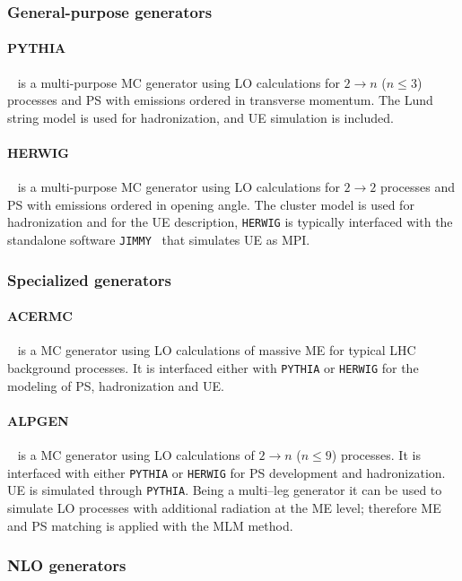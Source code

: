 \subsubsection*{General-purpose generators}

\paragraph{PYTHIA}~\cite{pythia6,pythia8} is a multi-purpose MC
generator using LO calculations for $2 \to n$ ($n\leq 3$) processes
and PS with emissions ordered in transverse momentum. 
The Lund string model is used for hadronization, and UE simulation is
included.

\paragraph{HERWIG}~\cite{herwig} is a multi-purpose MC generator using LO
calculations for $2 \to 2$ processes and PS with emissions ordered in
opening angle. 
The cluster model is used for hadronization and for the UE
description, \texttt{HERWIG} is typically interfaced with the
standalone software \texttt{JIMMY}~\cite{jimmy} that simulates UE as MPI.

\subsubsection*{Specialized generators}

\paragraph{ACERMC}~\cite{acermc} is a MC generator using LO
calculations of massive ME for typical LHC background processes. It is
interfaced either with \texttt{PYTHIA} or \texttt{HERWIG} for the
modeling of PS, hadronization and UE.

\paragraph{ALPGEN}~\cite{alpgen} is a MC generator using LO calculations
of $2 \to n$ ($n\leq 9$) processes. It is interfaced with either
\texttt{PYTHIA} or \texttt{HERWIG} for PS development and
hadronization. UE is simulated through \texttt{PYTHIA}. Being a
multi--leg generator it can be used to simulate LO processes with
additional radiation at the ME level; therefore ME and PS matching is
applied with the MLM method.

\subsubsection*{NLO generators}

